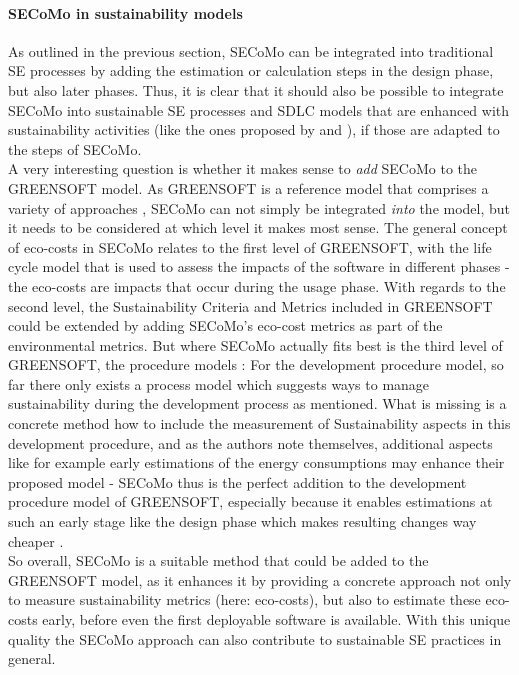 \documentclass[oribibl]{llncs}
\begin{document}
\paragraph{SECoMo in sustainability models}
As outlined in the previous section, SECoMo can be integrated into traditional SE %
processes by adding the estimation or calculation steps in the design phase, but also later phases. Thus, it is clear that it should also be possible to integrate SECoMo into sustainable SE processes and SDLC models that are enhanced with sustainability activities (like the ones proposed by \cite{agarwal_sustainable_2012} and \cite{shenoy_green_2011}), if those are adapted to the steps of SECoMo.\\
A very interesting question is whether it makes sense to \textit{add} SECoMo to the GREENSOFT model. As GREENSOFT is a reference model that comprises a variety of approaches \cite{naumann_greensoft_2011}, SECoMo can not simply be integrated \textit{into} the model, but it needs to be considered at which level it makes most sense. The general concept of eco-costs in SECoMo relates to the first level of GREENSOFT, with the life cycle model that is used to assess the impacts of the software in different phases \cite{naumann_greensoft_2011} - the eco-costs are impacts that occur during the usage phase. With regards to the second level, the Sustainability Criteria and Metrics included in GREENSOFT could be extended by adding SECoMo's eco-cost metrics as part of the environmental metrics. But where SECoMo actually fits best is the third level of GREENSOFT, the procedure models \cite{naumann_greensoft_2011}: For the development procedure model, so far there only exists a process model which suggests ways to manage sustainability during the development process %
as mentioned. What is missing is a concrete method how to include the measurement of Sustainability aspects in this development procedure, and as the authors note themselves, additional aspects like for example early estimations of the energy consumptions may enhance their proposed model \cite{naumann_greensoft_2011} %
- SECoMo thus is the perfect addition to the development procedure model of GREENSOFT, especially because it enables estimations at such an early stage like the design phase which makes resulting changes way cheaper \cite{schulze_cost_2016}.\\
So overall, SECoMo is a suitable method that could be added to the GREENSOFT model, as it enhances it by providing a concrete approach not only to measure sustainability metrics (here: eco-costs), but also to estimate these eco-costs early, before even the first deployable software is available. With this unique quality the SECoMo approach can also contribute to sustainable SE practices in general. %
\end{document}
